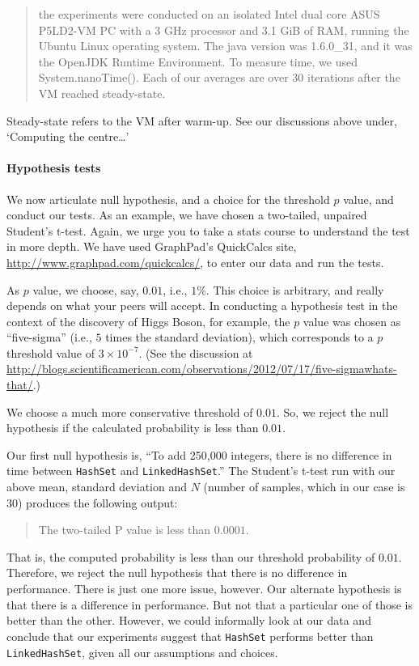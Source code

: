 \begin{quote}
 the experiments were conducted on an isolated Intel dual core
 ASUS P5LD2-VM PC with a 3 GHz processor and 3.1 GiB of RAM,
 running the Ubuntu Linux operating system. The java
 version was 1.6.0\_31, and it was the OpenJDK Runtime Environment.
 To measure time, we used System.nanoTime().
 Each of our averages are over 30 iterations after the VM
 reached steady-state.
 \end{quote}
 Steady-state refers to the VM after 
 warm-up. See our discussions above under,
 `Computing the centre\ldots'

\paragraph{Hypothesis tests} We now articulate null hypothesis,
and a choice for the threshold $p$ value, and conduct our tests.
As an example, we have chosen a two-tailed, unpaired
Student's t-test. Again, we urge you to take a stats course
to understand the test in more depth. We have used 
GraphPad's QuickCalcs site, \url{http://www.graphpad.com/quickcalcs/},
to enter our data and run the tests.

As $p$ value, we choose, say, $0.01$, i.e., $1\%$. This choice
is arbitrary, and really depends on what your peers will accept.
In conducting a hypothesis test in the context of the discovery
of Higgs Boson, for example, the $p$ value was chosen as
``five-sigma'' (i.e., $5$ times the standard deviation), which
corresponds to a $p$ threshold value of $3\times 10^{-7}$.
(See the discussion at \url{http://blogs.scientificamerican.com/observations/2012/07/17/five-sigmawhats-that/}.)

We choose a much more conservative threshold of $0.01$.
So, we reject the null hypothesis if the calculated probability
is less than $0.01$.

Our first null hypothesis is, ``To add 250,000 integers, there
is no difference in time between \texttt{HashSet} and \texttt{LinkedHashSet}.''
The Student's t-test run with our above mean, standard deviation
and $N$ (number of samples, which in our case is $30$) produces
the following output:
\begin{quote}
    The two-tailed P value is less than $0.0001$.
\end{quote}
That is, the computed probability is less than our threshold
probability of $0.01$. Therefore, we reject the null hypothesis
that there is no difference in performance. There is just one
more issue, however. Our alternate hypothesis is that there
is a difference in performance. But not that a particular one
of those is better than the other. However, we could informally
look at our data and conclude that our experiments suggest that
\texttt{HashSet} performs better than \texttt{LinkedHashSet}, given all our
assumptions and choices.

